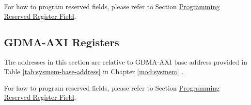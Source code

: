 \documentclass[main\_\_EN.tex]{subfiles}
\begin{document}
For how to program reserved fields, please refer to Section \hyperref[programming-reserved-field]{Programming Reserved Register Field}.



\subsection{GDMA-AXI Registers}

The addresses in this section are relative to GDMA-AXI base address provided in Table \ref{tab:sysmem-base-address} in Chapter \ref{mod:sysmem} \textit{}.

For how to program reserved fields, please refer to Section \hyperref[programming-reserved-field]{Programming Reserved Register Field}.


\end{document}
